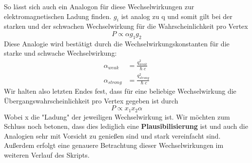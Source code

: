 \documentclass[Ex4_Zusammenfassung.tex]{subfiles}
\begin{document}
	So lässt sich auch ein Analogon für diese Wechselwirkungen zur elektromagnetischen Ladung finden. $g_i$ ist analog zu q und somit gilt bei der starken und der schwachen Wechselwirkung für die Wahrscheinlichkeit pro Vertex 
	\begin{equation}
	P \propto \alpha g_1 g_2
	\end{equation}
	Diese Analogie wird bestätigt durch die Wechselwirkungskonstanten für die starke und schwache Wechselwirkung:
	\begin{align}
	\alpha_{weak} &= \frac{q_{weak}^2}{\hslash c} \\
	\alpha_{strong} &= \frac{q_{strong}^2}{\hslash c}
	\end{align}
	Wir halten also letzten Endes fest, dass für eine beliebige Wechselwirkung die Übergangswahrscheinlichkeit pro Vertex gegeben ist durch 
	\begin{equation}
	P \propto x_1 x_2 \alpha
	\end{equation}
	Wobei x die "Ladung" der jeweiligen Wechselwirkung ist. Wir möchten zum Schluss noch betonen, dass dies lediglich eine \textbf{Plausibilisierung} ist und auch die Analogien sehr mit Vorsicht zu genießen sind und stark vereinfacht sind. Außerdem erfolgt eine genauere Betrachtung dieser Wechselwirkungen im weiteren Verlauf des Skripts. \\ \newline
	
\end{document}
